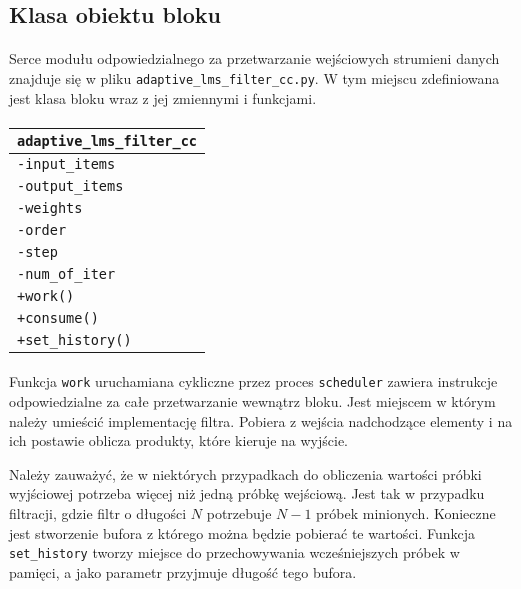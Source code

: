 \subsection{Klasa obiektu bloku}
\paragraph{}
Serce modułu odpowiedzialnego za przetwarzanie wejściowych strumieni danych znajduje się w pliku  \texttt{adaptive\_lms\_filter\_cc.py}. W tym miejscu zdefiniowana jest klasa bloku wraz z jej zmiennymi i funkcjami.

\paragraph{}
\begin{tabular}{|l|} \hline
\texttt{adaptive\_lms\_filter\_cc} \\
\hline
\texttt{-input\_items} \\
\texttt{-output\_items} \\
\texttt{-weights} \\
\texttt{-order} \\
\texttt{-step} \\
\texttt{-num\_of\_iter} \\
\hline
\texttt{+work()} \\
\texttt{+consume()} \\
\texttt{+set\_history()} \\
\hline
\end{tabular}

\paragraph{}
Funkcja \texttt{work} uruchamiana cykliczne przez proces \texttt{scheduler} zawiera instrukcje odpowiedzialne za całe przetwarzanie wewnątrz bloku. 
Jest miejscem w którym należy umieścić implementację filtra. 
Pobiera z wejścia nadchodzące elementy i na ich postawie oblicza produkty, które kieruje na wyjście.

Należy zauważyć, że w niektórych przypadkach do obliczenia wartości próbki wyjściowej potrzeba więcej niż jedną próbkę wejściową. 
Jest tak w przypadku filtracji, gdzie filtr o długości $N$ potrzebuje $N-1$ próbek minionych. 
Konieczne jest stworzenie bufora z którego można będzie pobierać te wartości. 
Funkcja \texttt{set\_history} tworzy miejsce do przechowywania wcześniejszych próbek w pamięci, a jako parametr przyjmuje długość tego bufora.

